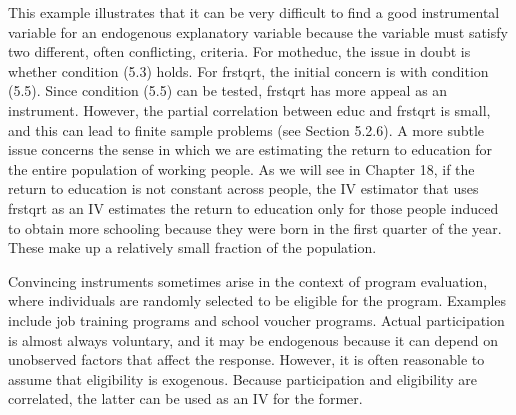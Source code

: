 \documentclass[10pt]{article}
\begin{document}
This example illustrates that it can be very difficult to find a good instrumental variable for an endogenous explanatory variable because the variable must satisfy two different, often conflicting, criteria. For motheduc, the issue in doubt is whether condition (5.3) holds. For frstqrt, the initial concern is with condition (5.5). Since condition (5.5) can be tested, frstqrt has more appeal as an instrument. However, the partial correlation between educ and frstqrt is small, and this can lead to finite sample problems (see Section 5.2.6). A more subtle issue concerns the sense in which we are estimating the return to education for the entire population of working people. As we will see in Chapter 18, if the return to education is not constant across people, the IV estimator that uses frstqrt as an IV estimates the return to education only for those people induced to obtain more schooling because they were born in the first quarter of the year. These make up a relatively small fraction of the population.

Convincing instruments sometimes arise in the context of program evaluation, where individuals are randomly selected to be eligible for the program. Examples include job training programs and school voucher programs. Actual participation is almost always voluntary, and it may be endogenous because it can depend on unobserved factors that affect the response. However, it is often reasonable to assume that eligibility is exogenous. Because participation and eligibility are correlated, the latter can be used as an IV for the former.
\end{document}
